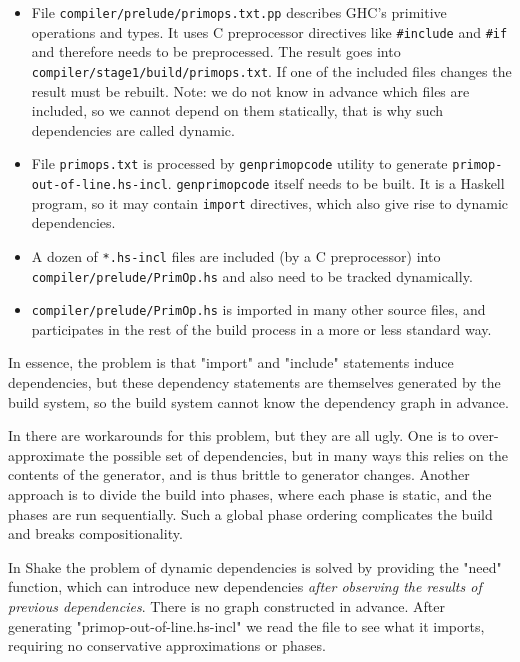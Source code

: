 \begin{itemize}
  \item File \texttt{compiler/prelude/primops.txt.pp} describes GHC's primitive
  operations and types. It uses C preprocessor directives like
  \texttt{\#include} and \texttt{\#if} and therefore needs to be preprocessed.
  The result goes into \texttt{compiler/stage1/build/primops.txt}. If one of the
  included files changes the result must be rebuilt. Note: we do not know in
  advance which files are included, so we cannot depend on them statically,
  that is why such dependencies are called dynamic.
  \item File \texttt{primops.txt} is processed by \texttt{genprimopcode} utility
  to generate \texttt{primop-out-of-line.hs-incl}. \texttt{genprimopcode} itself
  needs to be built. It is a Haskell program, so it may contain \texttt{import}
  directives, which also give rise to dynamic dependencies.
  \item A dozen of \texttt{*.hs-incl} files are included (by a C preprocessor)
  into \texttt{compiler/prelude/PrimOp.hs} and also need to be tracked
  dynamically.
  \item \texttt{compiler/prelude/PrimOp.hs} is imported in many other source
  files, and participates in the rest of the build process in a more or less
  standard way.
\end{itemize}

In essence, the problem is that \lst"import" and \lst"include" statements induce dependencies, but these dependency statements are themselves generated by the build system, so the build system cannot know the dependency graph in advance.

In \make{} there are workarounds for this problem, but they are all ugly. One is to over-approximate the possible set of dependencies, but in many ways this relies on the contents of the generator, and is thus brittle to generator changes. Another approach is to divide the build into phases, where each phase is static, and the phases are run sequentially. Such a global phase ordering complicates the build and breaks compositionality.


In Shake the problem of dynamic dependencies is solved by providing the \lst"need" function, which can introduce new dependencies \emph{after observing the results of previous dependencies}. There is no graph constructed in advance.  After generating \lst"primop-out-of-line.hs-incl" we read the file to see what it imports, requiring no conservative approximations or phases.

